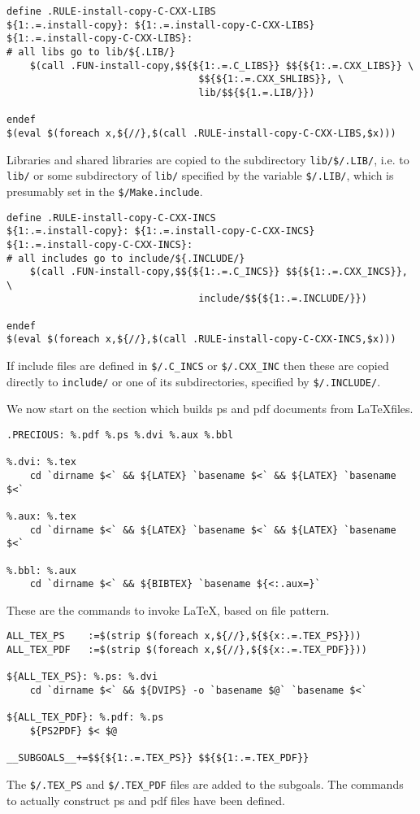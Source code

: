 \documentclass{article}
\begin{document}
\begin{verbatim}
define .RULE-install-copy-C-CXX-LIBS
${1:.=.install-copy}: ${1:.=.install-copy-C-CXX-LIBS}
${1:.=.install-copy-C-CXX-LIBS}:
# all libs go to lib/${.LIB/}
	$(call .FUN-install-copy,$${${1:.=.C_LIBS}} $${${1:.=.CXX_LIBS}} \
                                 $${${1:.=.CXX_SHLIBS}}, \
                                 lib/$${${1.=.LIB/}})

endef
$(eval $(foreach x,${//},$(call .RULE-install-copy-C-CXX-LIBS,$x)))
\end{verbatim}
Libraries and shared libraries are copied to the subdirectory
\verb+lib/$/.LIB/+, i.e. to \verb+lib/+ or some subdirectory of
\verb+lib/+ specified by the  variable \verb+$/.LIB/+, which is
presumably set in the \verb+$/Make.include+.

\begin{verbatim}
define .RULE-install-copy-C-CXX-INCS
${1:.=.install-copy}: ${1:.=.install-copy-C-CXX-INCS}
${1:.=.install-copy-C-CXX-INCS}:
# all includes go to include/${.INCLUDE/}
	$(call .FUN-install-copy,$${${1:.=.C_INCS}} $${${1:.=.CXX_INCS}}, \
                                 include/$${${1:.=.INCLUDE/}})

endef
$(eval $(foreach x,${//},$(call .RULE-install-copy-C-CXX-INCS,$x)))
\end{verbatim}
If include files are defined in \verb+$/.C_INCS+ or \verb+$/.CXX_INC+
then these are copied directly to \verb+include/+ or one of its
subdirectories, specified by \verb+$/.INCLUDE/+.

We now start on the section which builds ps and pdf documents from
\LaTeX files.
\begin{verbatim}
.PRECIOUS: %.pdf %.ps %.dvi %.aux %.bbl

%.dvi: %.tex
	cd `dirname $<` && ${LATEX} `basename $<` && ${LATEX} `basename $<`

%.aux: %.tex
	cd `dirname $<` && ${LATEX} `basename $<` && ${LATEX} `basename $<`

%.bbl: %.aux
	cd `dirname $<` && ${BIBTEX} `basename ${<:.aux=}`
\end{verbatim}
These are the commands to invoke \LaTeX, based on file pattern.

\begin{verbatim}
ALL_TEX_PS    :=$(strip $(foreach x,${//},${${x:.=.TEX_PS}}))
ALL_TEX_PDF   :=$(strip $(foreach x,${//},${${x:.=.TEX_PDF}}))

${ALL_TEX_PS}: %.ps: %.dvi
	cd `dirname $<` && ${DVIPS} -o `basename $@` `basename $<`

${ALL_TEX_PDF}: %.pdf: %.ps
	${PS2PDF} $< $@

__SUBGOALS__+=$${${1:.=.TEX_PS}} $${${1:.=.TEX_PDF}}
\end{verbatim}
The \verb+$/.TEX_PS+ and \verb+$/.TEX_PDF+ files are added to the
subgoals.  The commands to actually construct ps and pdf files 
have been defined.
\end{document}
